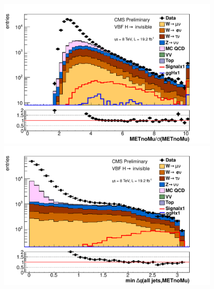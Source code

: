 \begin{figure}
  \includegraphics[width=.6\largefigwidth]{plots/parked/AN-14-243-figs/lognopreselnunu_metnomu_significance.pdf}
  \includegraphics[width=.6\largefigwidth]{plots/parked/AN-14-243-figs/logmetsigpreselnunu_alljetsmetnomu_mindphi.pdf}


\end{figure}
